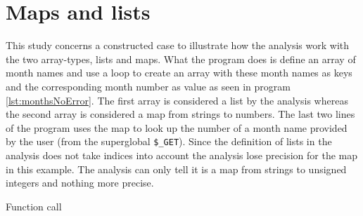 \section{Maps and lists}
This study concerns a constructed case to illustrate how the analysis work with the two array-types, lists and maps. What the program does is define an array of month names and use a loop to create an array with these month names as keys and the corresponding month number as value as seen in program \ref{lst:monthsNoError}. The first array is considered a list by the analysis whereas the second array is considered a map from strings to numbers. The last two lines of the program uses the map to look up the number of a month name provided by the user (from the superglobal \texttt{\$\_GET}). Since the definition of lists in the analysis does not take indices into account the analysis lose precision for the map in this example. The analysis can only tell it is a map from strings to unsigned integers and nothing more precise.

\begin{graph}
\centering
\captionsetup{justification=centering}
\begin{adjustbox}{max size={.3\textwidth}{.40\textheight}}\end{adjustbox}
\caption{Function call \label{graph:flowcall}}
\end{graph}


